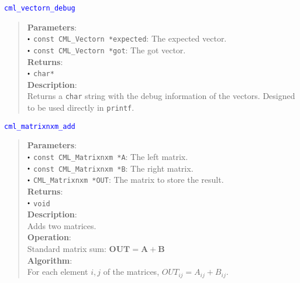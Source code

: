 \documentclass[a4paper,oneside,8pt]{extarticle}
\newcommand{\function}[1]{
  \noindent\textcolor{blue}{\texttt{#1}}
  \vspace{-0.3em}
}
\renewcommand{\dot}{\raisebox{0.3ex}{\scalebox{0.6}{$\bullet$}}}
\theoremstyle{definition}
\begin{document}
\function{cml\_vectorn\_debug}
\begin{quote}
  \textbf{Parameters}: \\
  $\dot$ \texttt{const CML\_Vectorn *expected}: The expected vector. \\
  $\dot$ \texttt{const CML\_Vectorn *got}: The got vector. \\
  \textbf{Returns}: \\
  $\dot$ \texttt{char*} \\

  \vspace{-0.75em}
  \textbf{Description}: \\
  Returns a \texttt{char} string with the debug information of the vectors. Designed to be used directly in \texttt{printf}. \\
\end{quote}

\function{cml\_matrixnxm\_add}
\begin{quote}
  \textbf{Parameters}: \\
  $\dot$ \texttt{const CML\_Matrixnxm *A}: The left matrix. \\
  $\dot$ \texttt{const CML\_Matrixnxm *B}: The right matrix. \\
  $\dot$ \texttt{CML\_Matrixnxm *OUT}: The matrix to store the result. \\
  \textbf{Returns}: \\
  $\dot$ \texttt{void} \\

  \vspace{-0.75em}
  \textbf{Description}: \\
  Adds two matrices. \\

  \vspace{-0.75em}
  \textbf{Operation}: \\
  Standard matrix sum: $\mathbf{OUT} = \mathbf{A} + \mathbf{B}$ \\

  \vspace{-0.75em}
  \textbf{Algorithm}: \\
  For each element $i, j$ of the matrices, $OUT_{ij} = A_{ij} + B_{ij}$. \\
\end{quote}
\end{document}

